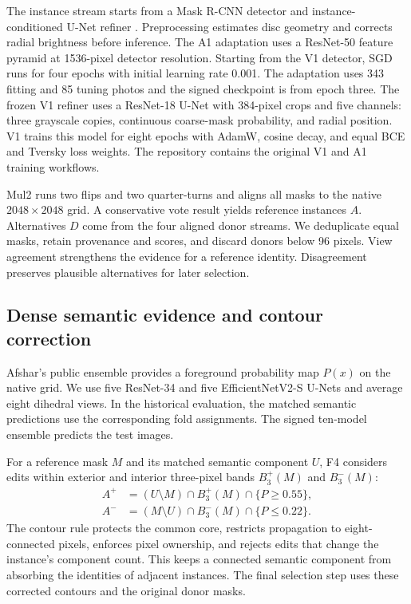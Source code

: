 \documentclass[sigconf]{acmart}
\begin{document}
The instance stream starts from a Mask R-CNN detector \cite{he2017mask} and instance-conditioned U-Net refiner \cite{ronneberger2015unet}. Preprocessing estimates disc geometry and corrects radial brightness before inference. The A1 adaptation uses a ResNet-50 feature pyramid \cite{lin2017fpn} at 1536-pixel detector resolution. Starting from the V1 detector, SGD runs for four epochs with initial learning rate 0.001. The adaptation uses 343 fitting and 85 tuning photos and the signed checkpoint is from epoch three. The frozen V1 refiner uses a ResNet-18 U-Net with 384-pixel crops and five channels: three grayscale copies, continuous coarse-mask probability, and radial position. V1 trains this model for eight epochs with AdamW, cosine decay, and equal BCE and Tversky loss weights. The repository contains the original V1 and A1 training workflows.

Mul2 runs two flips and two quarter-turns and aligns all masks to the native $2048\times2048$ grid. A conservative vote result yields reference instances $A$. Alternatives $D$ come from the four aligned donor streams. We deduplicate equal masks, retain provenance and scores, and discard donors below 96 pixels. View agreement strengthens the evidence for a reference identity. Disagreement preserves plausible alternatives for later selection.



\subsection{Dense semantic evidence and contour correction}
Afshar's public ensemble \cite{afshar2026solar} provides a foreground probability map $P(x)$ on the native grid. We use five ResNet-34 and five EfficientNetV2-S U-Nets and average eight dihedral views. In the historical evaluation, the matched semantic predictions use the corresponding fold assignments. The signed ten-model ensemble predicts the test images.

For a reference mask $M$ and its matched semantic component $U$, F4 considers edits within exterior and interior three-pixel bands $B_3^+(M)$ and $B_3^-(M)$:
\begin{align}
A^+ &= (U\setminus M)\cap B_3^+(M)\cap\{P\geq0.55\},\\
A^- &= (M\setminus U)\cap B_3^-(M)\cap\{P\leq0.22\}.
\end{align}
The contour rule protects the common core, restricts propagation to eight-connected pixels, enforces pixel ownership, and rejects edits that change the instance's component count. This keeps a connected semantic component from absorbing the identities of adjacent instances. The final selection step uses these corrected contours and the original donor masks.
\end{document}
